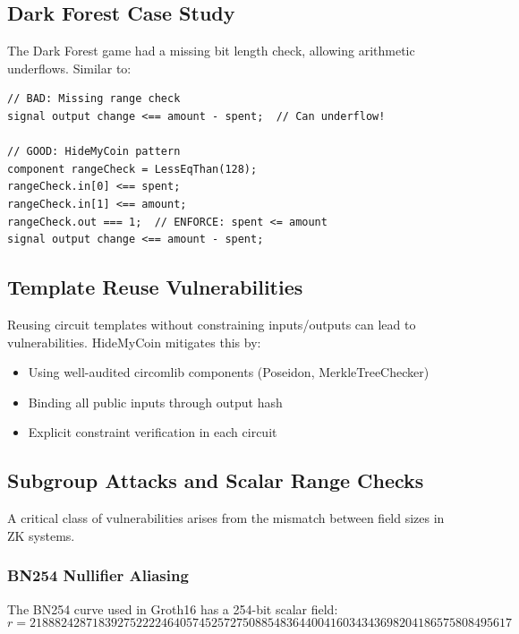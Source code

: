 \documentclass[11pt,a4paper]{article}
\begin{document}
\subsection{Dark Forest Case Study}

The Dark Forest game had a missing bit length check, allowing arithmetic underflows. Similar to:

\begin{lstlisting}[style=circom]
// BAD: Missing range check
signal output change <== amount - spent;  // Can underflow!

// GOOD: HideMyCoin pattern
component rangeCheck = LessEqThan(128);
rangeCheck.in[0] <== spent;
rangeCheck.in[1] <== amount;
rangeCheck.out === 1;  // ENFORCE: spent <= amount
signal output change <== amount - spent;
\end{lstlisting}

\subsection{Template Reuse Vulnerabilities}

Reusing circuit templates without constraining inputs/outputs can lead to vulnerabilities. HideMyCoin mitigates this by:
\begin{itemize}
    \item Using well-audited circomlib components (Poseidon, MerkleTreeChecker)
    \item Binding all public inputs through output hash
    \item Explicit constraint verification in each circuit
\end{itemize}

\subsection{Subgroup Attacks and Scalar Range Checks}

A critical class of vulnerabilities arises from the mismatch between field sizes in ZK systems.

\subsubsection{BN254 Nullifier Aliasing}

The BN254 curve used in Groth16 has a 254-bit scalar field:
\begin{equation}
r = 21888242871839275222246405745257275088548364400416034343698204186575808495617
\end{equation}
\end{document}

